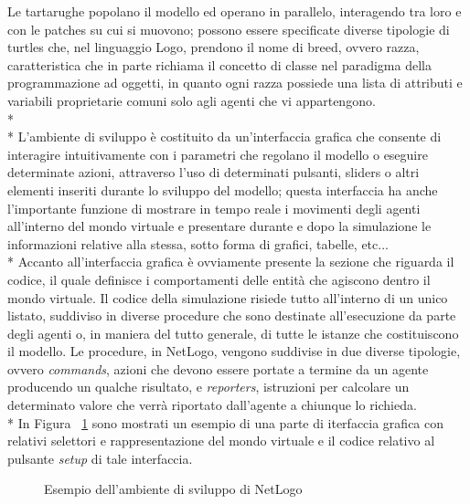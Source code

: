 \documentclass[12pt,a4paper,openright,twoside]{report}
\begin{document}
Le tartarughe popolano il modello ed operano in parallelo, interagendo tra loro e con le patches su cui si muovono; possono essere specificate diverse tipologie di turtles che, nel linguaggio Logo, prendono il nome di breed, ovvero razza, caratteristica che in parte richiama il concetto di classe nel paradigma della programmazione ad oggetti, in quanto ogni razza possiede una lista di attributi e variabili proprietarie comuni solo agli agenti che vi appartengono.\\*\\*
L'ambiente di sviluppo è costituito da un'interfaccia grafica che consente di interagire intuitivamente con i parametri che regolano il modello o eseguire determinate azioni, attraverso l'uso di determinati pulsanti, sliders o altri elementi inseriti durante lo sviluppo del modello; questa interfaccia ha anche l'importante funzione di mostrare in tempo reale i movimenti degli agenti all'interno del mondo virtuale e presentare durante e dopo la simulazione le informazioni relative alla stessa, sotto forma di grafici, tabelle, etc...\\*
Accanto all'interfaccia grafica è ovviamente presente la sezione che riguarda il codice, il quale definisce i comportamenti delle entità  che agiscono dentro il mondo virtuale. Il codice della simulazione risiede tutto all'interno di un unico listato, suddiviso in diverse procedure che sono destinate all'esecuzione da parte degli agenti o, in maniera del tutto generale, di tutte le istanze che costituiscono il modello. Le procedure, in NetLogo, vengono suddivise in due diverse tipologie, ovvero \emph{commands}, azioni che devono essere portate a termine da un agente producendo un qualche risultato, e \emph{reporters}, istruzioni per calcolare un determinato valore che verrà riportato dall'agente a chiunque lo richieda. \\*
In Figura ~\ref{netlogoUI_code} sono mostrati un esempio di una parte di iterfaccia grafica con relativi selettori e rappresentazione del mondo virtuale e il codice relativo al pulsante \emph{setup} di tale interfaccia.

\begin{figure}[hbt]
	\centering
	\quad 
	\caption{Esempio dell'ambiente di sviluppo di NetLogo}
	\label{netlogoUI_code}
\end{figure}
\end{document}
